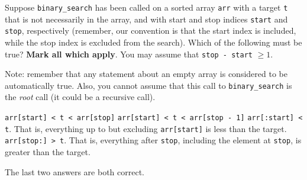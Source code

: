 \begin{prob}
    Suppose \texttt{binary_search} has been called on a sorted array \texttt{arr}
    with a target \texttt{t} that is not necessarily in the array, and with
    start and stop indices \texttt{start} and \texttt{stop}, respectively
    (remember, our convention is that the start index is included, while the
    stop index is excluded from the search). Which of the following must be true?
    \textbf{Mark all which apply}. You may assume that \texttt{stop - start} $\geq 1$.

    Note: remember that any statement about an empty array is considered to be
    automatically true. Also, you cannot assume that this call to \texttt{binary_search}
    is the \textit{root} call (it could be a recursive call).

    \begin{choices}
        \choice  \texttt{arr[start] < t < arr[stop]}
        \choice  \texttt{arr[start] < t < arr[stop - 1]}
        \correctchoice  \texttt{arr[:start] < t}. That is, everything up to but
            excluding \texttt{arr[start]} is less than the target.
        \correctchoice  \texttt{arr[stop:] > t}. That is, everything after \texttt{stop},
            including the element at \texttt{stop}, is greater than the target.
    \end{choices}

    \begin{soln}
        The last two answers are both correct.
    \end{soln}
\end{prob}
